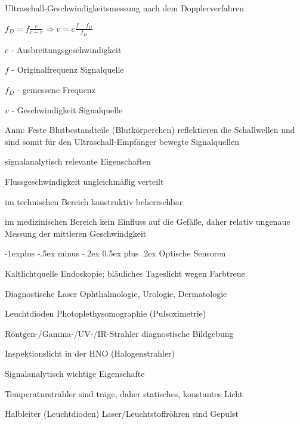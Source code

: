 \documentclass[a4paper]{article}
\makeatletter
\renewcommand{\subsection}{\@startsection{subsection}{2}{0mm}%
 {-1explus -.5ex minus -.2ex}%
 {0.5ex plus .2ex}%
 {\normalfont\normalsize\bfseries}}
\makeatother
\begin{document}
\begin{multicols}{3}
  Ultraschall-Geschwindigkeitsmessung nach dem Dopplerverfahren
  \begin{itemize*}
    \item $f_D=f\frac{c}{c-v} \Rightarrow v=c\frac{f-f_D}{f_D}$
    \item $c$ - Ausbreitungsgeschwindigkeit
    \item $f$ - Originalfrequenz Signalquelle
    \item $f_D$ - gemessene Frequenz
    \item $v$ - Geschwindigkeit Signalquelle
    \item Anm: Feste Blutbestandteile (Blutkörperchen) reflektieren die Schallwellen und sind somit für den Ultraschall-Empfänger bewegte Signalquellen
  \end{itemize*}
  signalanalytisch relevante Eigenschaften
  \begin{itemize*}
    \item Flussgeschwindigkeit ungleichmäßig verteilt
    \item im technischen Bereich konstruktiv beherrschbar %
    \item im medizinischen Bereich kein Einfluss auf die Gefäße, daher relativ ungenaue Messung der mittleren Geschwindgkeit
  \end{itemize*}

  \subsection{Optische Sensoren}\label{optische-sensoren}
  \begin{description*}
    \item[Kaltlichtquelle] Endoskopie; bläuliches Tageslicht wegen Farbtreue
    \item[Diagnostische Laser] Ophthalmologie, Urologie, Dermatologie
    \item[Leuchtdioden] Photoplethysomographie (Pulsoximetrie)
    \item[Röntgen-/Gamma-/UV-/IR-Strahler] diagnostische Bildgebung
    \item[Inspektionslicht] in der HNO (Halogenstrahler)
  \end{description*}

  Signalanalytisch wichtige Eigenschafte
  \begin{description*}
    \item[Temperaturstrahler] sind träge, daher statisches, konstantes Licht
    \item[Halbleiter] (Leuchtdioden) Laser/Leuchtstoffröhren sind Gepulst
  \end{description*}


\end{multicols}
\end{document}
